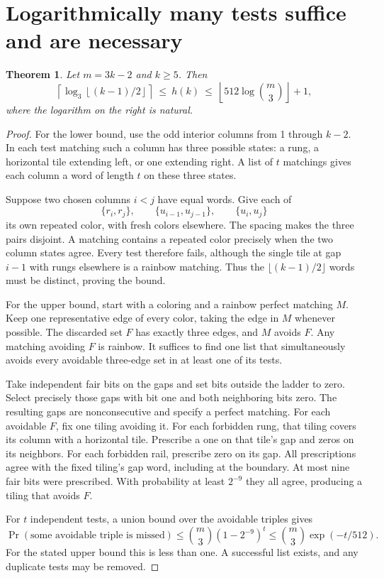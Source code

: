 \documentclass[11pt]{article}
\newtheorem{theorem}{Theorem}
\begin{document}
\section{Logarithmically many tests suffice and are necessary}
\begin{theorem}Let \(m=3k-2\) and \(k\ge5\). Then
\[
 \left\lceil\log_3\left\lfloor (k-1)/2\right\rfloor\right\rceil
 \ \le\ h(k)\ \le\
 \left\lfloor512\log\binom{m}{3}\right\rfloor+1 ,
\]
where the logarithm on the right is natural.\end{theorem}
\begin{proof}
For the lower bound, use the odd interior columns from 1 through \(k-2\).
In each test matching such a column has three possible states: a rung, a
horizontal tile extending left, or one extending right. A list of \(t\)
matchings gives each column a word of length \(t\) on these three states.

Suppose two chosen columns \(i<j\) have equal words. Give each of
\[
 \{r_i,r_j\},\qquad \{u_{i-1},u_{j-1}\},\qquad \{u_i,u_j\}
\]
its own repeated color, with fresh colors elsewhere. The spacing makes
the three pairs disjoint. A matching contains a repeated color precisely
when the two column states agree. Every test therefore fails, although
the single tile at gap \(i-1\) with rungs elsewhere is a rainbow matching.
Thus the \(\lfloor(k-1)/2\rfloor\) words must be distinct, proving the bound.

For the upper bound, start with a coloring and a rainbow perfect matching
\(M\). Keep one representative edge of every color, taking the edge in
\(M\) whenever possible. The discarded set \(F\) has exactly three edges,
and \(M\) avoids \(F\). Any matching avoiding \(F\) is rainbow.
It suffices to find one list that simultaneously avoids every avoidable
three-edge set in at least one of its tests.

Take independent fair bits on the gaps and set bits outside the ladder to
zero. Select precisely those gaps with bit one and both neighboring bits
zero. The resulting gaps are nonconsecutive and specify a perfect matching.
For each avoidable \(F\), fix one tiling avoiding it. For each forbidden
rung, that tiling covers its column with a horizontal tile. Prescribe a one
on that tile's gap and zeros on its neighbors. For each forbidden rail,
prescribe zero on its gap. All prescriptions agree with the fixed tiling's
gap word, including at the boundary. At most nine fair bits were prescribed.
With probability at least \(2^{-9}\) they all agree, producing a tiling
that avoids \(F\).

For \(t\) independent tests, a union bound over the avoidable triples gives
\[
 \Pr(\text{some avoidable triple is missed})\le
 \binom{m}{3}(1-2^{-9})^t\le\binom{m}{3}\exp(-t/512).
\]
For the stated upper bound this is less than one. A
successful list exists, and any duplicate tests may be removed.
\end{proof}
\end{document}
